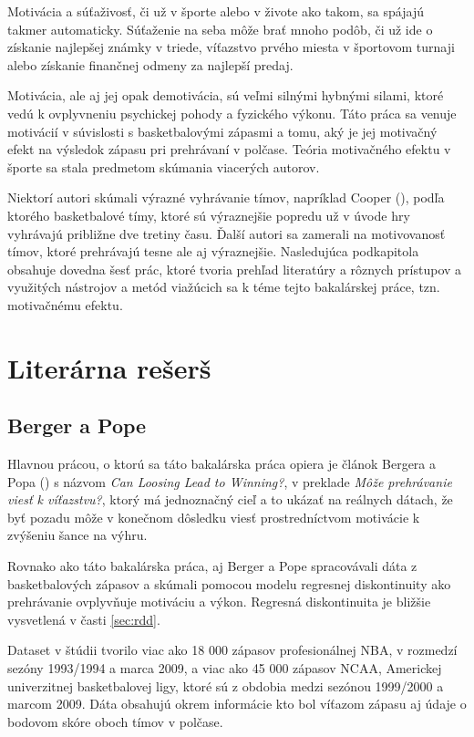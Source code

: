 \documentclass[
  digital, %
  twoside, %
  notable,   %
  lof,     %
  lot,     %
]{fithesis3}
\begin{document}
		Motivácia a súťaživosť, či už v športe alebo v živote ako takom, sa spájajú takmer automaticky. Súťaženie na seba môže brať mnoho podôb, či už ide o získanie najlepšej známky v triede, víťazstvo prvého miesta v športovom turnaji alebo získanie finančnej odmeny za najlepší predaj. \parencite[s.~210]{tauer1999}
		
		Motivácia, ale aj jej opak demotivácia, sú veľmi silnými hybnými silami, ktoré vedú k ovplyvneniu psychickej pohody a fyzického výkonu. Táto práca sa venuje motivácií v súvislosti s basketbalovými zápasmi a tomu, aký je jej motivačný efekt na výsledok zápasu pri prehrávaní v polčase. Teória motivačného efektu v športe sa stala predmetom skúmania viacerých autorov. 
		
		Niektorí autori skúmali výrazné vyhrávanie tímov, napríklad Cooper (\citeyear{cooper1992}), podľa ktorého basketbalové tímy, ktoré sú výraznejšie popredu už v úvode hry vyhrávajú približne dve tretiny času. Ďalší autori sa zamerali na motivovanosť tímov, ktoré prehrávajú tesne ale aj výraznejšie. Nasledujúca podkapitola obsahuje dovedna šesť prác, ktoré tvoria prehľad literatúry a rôznych prístupov a využitých nástrojov a metód viažúcich sa k téme tejto bakalárskej práce, tzn. motivačnému efektu. 
		
		\section{Literárna rešerš}
		\subsection{Berger a Pope}
		\label{sec:Berger}
		Hlavnou prácou, o ktorú sa táto bakalárska práca opiera je článok Bergera a Popa (\citeyear{berger2011}) s názvom \textit{Can Loosing Lead to Winning?}, v preklade \textit{Môže prehrávanie viesť k víťazstvu?}, ktorý má jednoznačný cieľ a to ukázať na reálnych dátach, že byť pozadu môže v konečnom dôsledku viesť prostredníctvom motivácie k zvýšeniu šance na výhru.
		
		Rovnako ako táto bakalárska práca, aj Berger a Pope spracovávali dáta z basketbalových zápasov a skúmali pomocou modelu regresnej diskontinuity ako prehrávanie ovplyvňuje motiváciu a výkon. Regresná diskontinuita je bližšie vysvetlená v časti \ref{sec:rdd}.
		
		Dataset v štúdii tvorilo viac ako 18 000 zápasov profesionálnej NBA, v rozmedzí sezóny 1993/1994 a marca 2009, a viac ako 45 000 zápasov NCAA, Americkej univerzitnej basketbalovej ligy, ktoré sú z obdobia medzi sezónou 1999/2000 a marcom 2009. \parencite[s.~818]{berger2011} Dáta obsahujú okrem informácie kto bol víťazom zápasu aj údaje o bodovom skóre oboch tímov v polčase.
		
\end{document}
